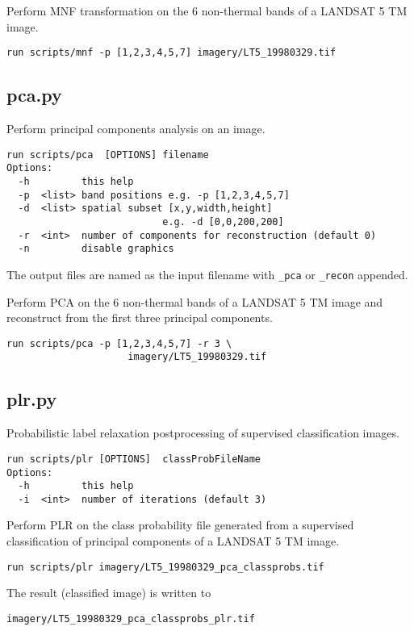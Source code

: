 \documentclass{paper}
\begin{document}
 Perform MNF transformation on the 6 non-thermal bands of a LANDSAT 5 TM image.
\begin{lstlisting}
run scripts/mnf -p [1,2,3,4,5,7] imagery/LT5_19980329.tif
\end{lstlisting}





\subsection*{pca.py}


Perform principal components analysis on an image.
\begin{verbatim}
run scripts/pca  [OPTIONS] filename
Options:
  -h         this help
  -p  <list> band positions e.g. -p [1,2,3,4,5,7]
  -d  <list> spatial subset [x,y,width,height]
                           e.g. -d [0,0,200,200]
  -r  <int>  number of components for reconstruction (default 0)
  -n         disable graphics
\end{verbatim}
The output files are named as the input filename with {\tt \_pca} or {\tt \_recon} appended.


 Perform PCA on the 6 non-thermal bands of a LANDSAT 5 TM image and reconstruct from the first three principal components.
\begin{lstlisting}
run scripts/pca -p [1,2,3,4,5,7] -r 3 \
                     imagery/LT5_19980329.tif
\end{lstlisting}


\subsection*{plr.py}
Probabilistic label relaxation postprocessing of supervised classification images.
\begin{verbatim}
run scripts/plr [OPTIONS]  classProbFileName
Options:
  -h         this help
  -i  <int>  number of iterations (default 3)
\end{verbatim}
 Perform PLR on the class probability file generated from a supervised classification of principal components of a LANDSAT 5 TM image.
\begin{lstlisting}
run scripts/plr imagery/LT5_19980329_pca_classprobs.tif
\end{lstlisting}
The result (classified image) is written to
\begin{lstlisting}
imagery/LT5_19980329_pca_classprobs_plr.tif
\end{lstlisting}
\end{document}
